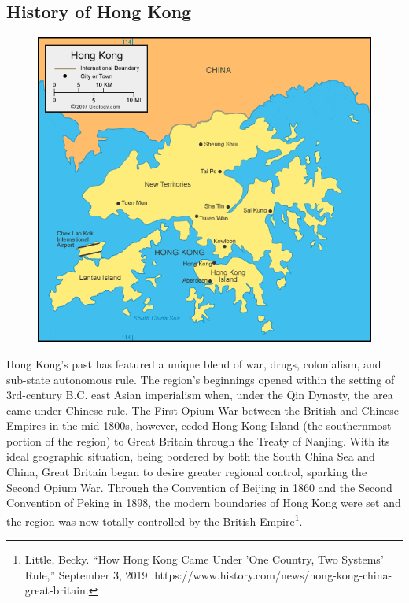 \documentclass[10pt, letterpaper]{article}
\begin{document}
\subsection{History of Hong Kong}
  \begin{figure}
\centering
\includegraphics[scale = 0.35]{image4.png} 
\end{figure}

Hong Kong's past has featured a unique blend of war, drugs, colonialism,
and sub-state autonomous rule. The region's beginnings opened within the
setting of 3rd-century B.C. east Asian imperialism when, under the Qin
Dynasty, the area came under Chinese rule. The First Opium War between
the British and Chinese Empires in the mid-1800s, however, ceded Hong
Kong Island (the southernmost portion of the region) to Great Britain
through the Treaty of Nanjing. With its ideal geographic situation,
being bordered by both the South China Sea and China, Great Britain
began to desire greater regional control, sparking the Second Opium War.
Through the Convention of Beijing in 1860 and the Second Convention of
Peking in 1898, the modern boundaries of Hong Kong were set and the
region was now totally controlled by the British Empire\footnote{Little,
  Becky. ``How Hong Kong Came Under 'One Country, Two Systems' Rule,''
  September 3, 2019.
  https://www.history.com/news/hong-kong-china-great-britain.}.\\
  
\end{document}
